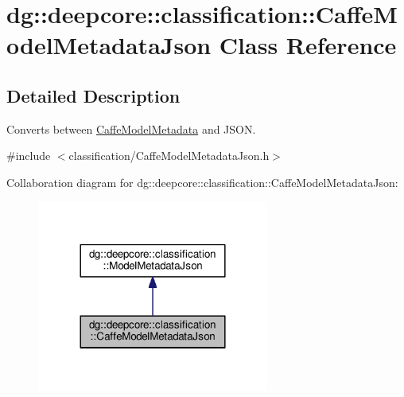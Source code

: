 \hypertarget{classdg_1_1deepcore_1_1classification_1_1_caffe_model_metadata_json}{}\section{dg\+:\+:deepcore\+:\+:classification\+:\+:Caffe\+Model\+Metadata\+Json Class Reference}
\label{classdg_1_1deepcore_1_1classification_1_1_caffe_model_metadata_json}


\subsection{Detailed Description}
Converts between \hyperlink{structdg_1_1deepcore_1_1classification_1_1_caffe_model_metadata}{Caffe\+Model\+Metadata} and J\+S\+ON. 

{\ttfamily \#include $<$classification/\+Caffe\+Model\+Metadata\+Json.\+h$>$}



Collaboration diagram for dg\+:\+:deepcore\+:\+:classification\+:\+:Caffe\+Model\+Metadata\+Json\+:
\nopagebreak
\begin{figure}[H]
\begin{center}
\leavevmode
\includegraphics[width=216pt]{classdg_1_1deepcore_1_1classification_1_1_caffe_model_metadata_json__coll__graph}
\end{center}
\end{figure}
